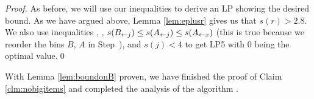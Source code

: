 \begin{proof}

As before, we will use our inequalities to derive an LP showing the desired
bound. As we have argued above, Lemma \ref{lem:eplusr} gives us that
$s(r) > 2.8$. We also use inequalities , ,
$s(B_{\leftarrow j}) \le s(A_{\leftarrow j}) \le s(A_{\leftarrow x})$
(this is true because we reorder the bins $B$, $A$ in Step~),
and $s(j) < 4$ to get LP5 with 0 being the optimal value.\qed
\end{proof}

With Lemma \ref{lem:boundonB} proven, we have finished the proof of Claim \ref{clm:nobigitems}
and completed the analysis of the algorithm \tbalg.

